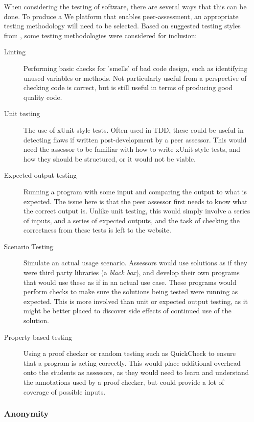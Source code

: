 \documentclass[sigplan,10pt,review]{acmart}\settopmatter{printfolios=true}
\begin{document}
When considering the testing of software, there are several ways that
this can be done. To produce a We platform that enables peer-assessment,
an appropriate testing methodology will need to be selected. Based on
suggested testing styles from  \citet{laboon_friendly_2016},
some testing methodologies were considered for inclusion:
\begin{description}
\item[Linting] Performing basic checks for 'smells' of bad code
  design, such as identifying unused variables or methods. Not
  particularly useful from a perspective of checking code is correct,
  but is still useful in terms of producing good quality code.
\item[Unit testing] The use of xUnit style tests. Often used in
  \ac{TDD}, these could be useful in detecting flaws if
  written post-development by a peer assessor. This would need the
  assessor to be familiar with how to write xUnit style tests, and how
  they should be structured, or it would not be viable.
\item[Expected output testing] Running a program with some input and
  comparing the output to what is expected. The issue here is that the
  peer assessor first needs to know what the correct output is. Unlike
  unit testing, this would simply involve a series of inputs, and a
  series of expected outputs, and the task of checking the correctness
  from these tests is left to the website.
\item[Scenario Testing] Simulate an actual usage scenario. Assessors
  would use solutions as if they were third party libraries (a
  \emph{black box}), and develop their own programs that would use
  these as if in an actual use case. These programs would perform
  checks to make sure the solutions being tested were running as
  expected. This is more involved than unit or expected output
  testing, as it might be better placed to discover side effects of
  continued use of the solution.
\item[Property based testing] Using a proof checker or random testing
  such as QuickCheck to ensure that a program is acting correctly. This
  would place additional overhead onto the students as assessors, as
  they would need to learn and understand the annotations used by a
  proof checker, but could provide a lot of coverage of possible
  inputs.
\end{description}

\subsubsection{Anonymity}
\end{document}
